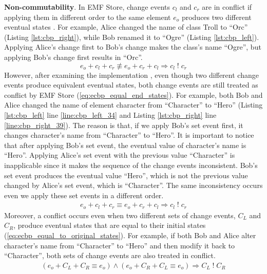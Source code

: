 \textbf{Non-commutability}. In EMF Store, change events $c_{l}$ and $c_{r}$ are in conflict if applying them in different order to the same element $e_{o}$ produces two different eventual states \cite{koegel2010operation}. For example, Alice changed the \textsf{name} of class \textsf{Troll} to “Orc” (Listing \ref{lst:cbp_right}), while Bob renamed it to “Ogre” (Listing \ref{lst:cbp_left}). Applying Alice’s change first to Bob’s change makes the class’s \textsf{name} “Ogre”, but applying Bob’s change first results in “Orc”.
\begin{equation} \label{eq:change_noncommutability}
e_{o} + c_{l} + c_{r} \not\equiv e_{o} + c_{r} + c_{l} \Rightarrow c_{l}\;!\;c_{r}
\end{equation}
However, after examining the implementation \cite{eclipse2019emfstore}, even though two different change events produce equivalent eventual states, both change events are still treated as conflict by EMF Store (\ref{eq:ecbp_equal_end_states}). For example, both Bob and Alice changed the \textsf{name} of element \textsf{character} from “Character” to “Hero” (Listing \ref{lst:cbp_left} line \ref{line:cbp_left_34} and Listing \ref{lst:cbp_right} line \ref{line:cbp_right_39}). The reason is that, if we apply Bob’s set event first, it changes \textsf{character}’s \textsf{name} from “Character” to “Hero”. It is important to notice that after applying Bob’s set event, the eventual value of \textsf{character}’s \textsf{name} is “Hero”. Applying Alice’s set event with the previous value “Character” is inapplicable since it makes the sequence of the change events inconsistent. Bob’s set event produces the eventual value “Hero”, which is not the previous value changed by Alice’s set event, which is “Character”. The same inconsistency occurs even we apply these set events in a different order.
\begin{equation} \label{eq:ecbp_equal_end_states}
\begin{split}
e_{o} + c_{l} + c_{r} \equiv e_{o} + c_{r} + c_{l} \Rightarrow c_{l}\;!\;c_{r}
\end{split}
\end{equation}
Moreover, a conflict occurs even when two different sets of change events, $C_{L}$ and $C_{R}$, produce eventual states that are equal to their initial states (\ref{eq:ecbp_equal_to_original_states}). For example, if both Bob and Alice alter \textsf{character}’s \textsf{name} from “Character” to “Hero” and then modify it back to “Character”, both sets of change events are also treated in conflict.
\begin{equation} \label{eq:ecbp_equal_to_original_states}
\begin{split}
(e_{o} + C_{L} + C_{R} \equiv e_{o}) \wedge (e_{o} + C_{R} + C_{L} \equiv e_{o}) \Rightarrow C_{L}\;!\;C_{R}
\end{split}
\end{equation}
